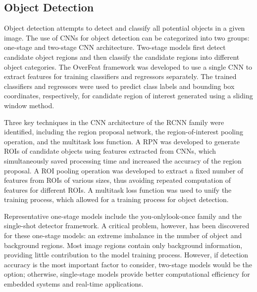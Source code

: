 \subsection{Object Detection}
Object detection attempts to detect and classify all potential objects in a given image. The use of CNNs for object detection can be categorized into two groups:
one-stage and two-stage CNN architecture. Two-stage models first detect candidate object regions and then classify the candidate regions into different object categories.
The OverFeat framework was developed to use a single CNN to extract features for training classifiers and regressors separately\cite{sermanet2013overfeat}. The trained classifiers and regressors
were used to predict class labels and bounding box coordinates, respectively, for candidate region of interest generated using a sliding window method.

Three key techniques in the CNN architecture of the RCNN family\cite{girshick2014rich} were identified, including the region proposal network, the region-of-interest pooling operation, and
the multitask loss function. A RPN was developed to generate ROIs of candidate objects using features extracted from CNNs, which simultaneously saved processing time
and increased the accuracy of the region proposal. A ROI pooling operation was developed to extract a fixed number of features from ROIs of various sizes, thus avoiding
repeated computation of features for different ROIs. A multitask loss function was used to unify the training process, which allowed for a training process for object
detection. 

Representative one-stage models include the you-onlylook-once family and the single-shot detector framework. A critical problem, however, has been
discovered for these one-stage models: an extreme imbalance in the number of object and background regions. Most image regions contain only background information,
providing little contribution to the model training process. However, if detection accuracy is the most important factor to consider, two-stage models would be
the option; otherwise, single-stage models provide better computational efficiency for embedded systems and real-time applications.



